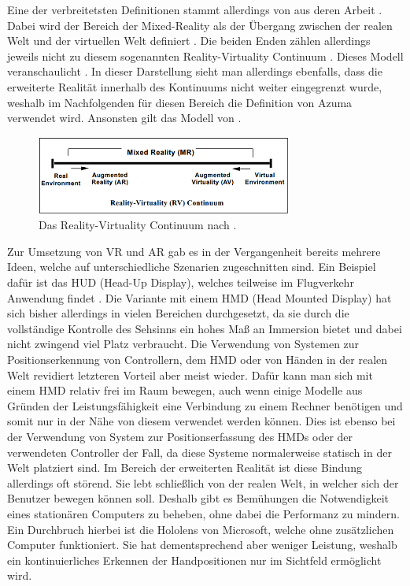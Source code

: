 	
	Eine der verbreitetsten Definitionen stammt allerdings von  aus deren Arbeit . Dabei wird der Bereich der Mixed-Reality als der Übergang zwischen der realen Welt und der virtuellen Welt definiert \cite{milgram}. Die beiden Enden zählen allerdings jeweils nicht zu diesem sogenannten Reality-Virtuality Continuum \cite{milgram}. Dieses Modell veranschaulicht . In dieser Darstellung sieht man allerdings ebenfalls, dass die erweiterte Realität innerhalb des Kontinuums nicht weiter eingegrenzt wurde, weshalb im Nachfolgenden für diesen Bereich die Definition von Azuma verwendet wird. Ansonsten gilt das Modell von  .
	
	\begin{figure}[htbp]
		\centering
		\includegraphics[width=0.75\textwidth]{figures/mixed_reality.png}
		\caption{Das Reality-Virtuality Continuum nach  .}
		\label{fig:mixed_reality}
	\end{figure}
	
	Zur Umsetzung von VR und AR gab es in der Vergangenheit bereits mehrere Ideen, welche auf unterschiedliche Szenarien zugeschnitten sind.
	Ein Beispiel dafür ist das HUD (Head-Up Display), welches teilweise im Flugverkehr Anwendung findet \cite{azuma}.
	Die Variante mit einem HMD (Head Mounted Display) hat sich bisher allerdings in vielen Bereichen durchgesetzt, da sie durch die vollständige Kontrolle des Sehsinns ein hohes Maß an Immersion bietet und dabei nicht zwingend viel Platz verbraucht. Die Verwendung von Systemen zur Positionserkennung von Controllern, dem HMD oder von Händen in der realen Welt revidiert letzteren Vorteil aber meist wieder. Dafür kann man sich mit einem HMD relativ frei im Raum bewegen, auch wenn einige Modelle aus Gründen der Leistungsfähigkeit eine Verbindung zu einem Rechner benötigen und somit nur in der Nähe von diesem verwendet werden können. Dies ist ebenso bei der Verwendung von System zur Positionserfassung des HMDs oder der verwendeten Controller der Fall, da diese Systeme normalerweise statisch in der Welt platziert sind. Im Bereich der erweiterten Realität ist diese Bindung allerdings oft störend. Sie lebt schließlich von der realen Welt, in welcher sich der Benutzer bewegen können soll. Deshalb gibt es Bemühungen die Notwendigkeit eines stationären Computers zu beheben, ohne dabei die Performanz zu mindern. Ein Durchbruch hierbei ist die Hololens von Microsoft, welche ohne zusätzlichen Computer funktioniert. Sie hat dementsprechend aber weniger Leistung, weshalb ein kontinuierliches Erkennen der Handpositionen nur im Sichtfeld ermöglicht wird.

